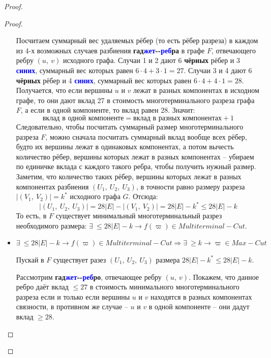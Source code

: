 \documentclass[a4paper,12pt]{article}
\begin{document}
\begin{proof}
\begin{proof}
\begin{itemize}
            Посчитаем суммарный вес удаляемых рёбер (то есть рёбер разреза) в каждом из 4-х возможных случаев разбиения \textbf{гад}\textbf{\textcolor{blue}{жет}}\textbf{-}\textbf{-}\textbf{\textcolor{blue}{реб}}\textbf{ра} в графе $F$, отвечающего ребру $(u,\ v)$ исходного графа. Случаи 1 и 2 дают 6 \textbf{чёрных} рёбер и 3 \textbf{\textcolor{blue}{синих}}, суммарный вес которых равен $6 \cdot 4 + 3 \cdot 1 = 27$. Случаи 3 и 4 дают 6 \textbf{чёрных} рёбер и 4 \textbf{\textcolor{blue}{синих}}, суммарный вес которых равен $6 \cdot 4 + 4 \cdot 1 = 28$. Получается, что если вершины $u$ и $v$ лежат в разных компонентах в исходном графе, то они дают вклад 27 в стоимость многотерминального разреза графа $F$, а если в одной компоненте, то вклад равен 28. Значит:
            \[\text{вклад в одной компоненте} = \text{вклад в разных компонентах} + 1\] Следовательно, чтобы посчитать суммарный размер многотерминального разреза $F$, можно сначала посчитать суммарный вклад вообще всех рёбер, будто их вершины лежат в одинаковых компонентах, а потом вычесть количество рёбер, вершины которых лежат в разных компонентах -- убираем по единичке вклада с каждого такого ребра, чтобы получить нужный размер. Заметим, что количество таких рёбер, вершины которых лежат в разных компонентах разбиения $(U_1,\ U_2,\ U_3)$, в точности равно размеру разреза $|(V_1,\ V_2)| = k^*$ исходного графа $G$. Отсюда:
            \[|(U_1,\ U_2,\ U_3)| = 28|E| - |(V_1,\ V_2)| = 28|E| - k^* \leqslant 28|E| - k\] То есть, в $F$ существует минимальный многотерминальный разрез необходимого размера: $\exists\ \leqslant 28|E| - k \to f(\varpi) \in Multiterminal-Cut$. 
            
            \item $\exists\ \leqslant 28|E| - k \to f(\varpi) \in Multiterminal-Cut \Longrightarrow \exists\ \geqslant k\to\varpi \in Max-Cut$
            
            Пускай в $F$ существует разез $(U_1,\ U_2,\ U_3)$ размера $28|E| - k^* \leqslant 28|E| - k$.
            
            Рассмотрим \textbf{гад}\textbf{\textcolor{blue}{жет}}\textbf{-}\textbf{-}\textbf{\textcolor{blue}{реб}}\textbf{ро}, отвечающее ребру $(u,\ v)$. Покажем, что данное ребро даёт вклад $\leqslant 27$ в стоимость минимального многотерминального разреза если и только если вершины $u$ и $v$ находятся в разных компонентах связности, в противном же случае -- $u$ и $v$ в одной компоненте -- они дадут вклад $\geqslant 28$.
            

\end{itemize}
\end{proof}
\end{proof}
\end{document}
